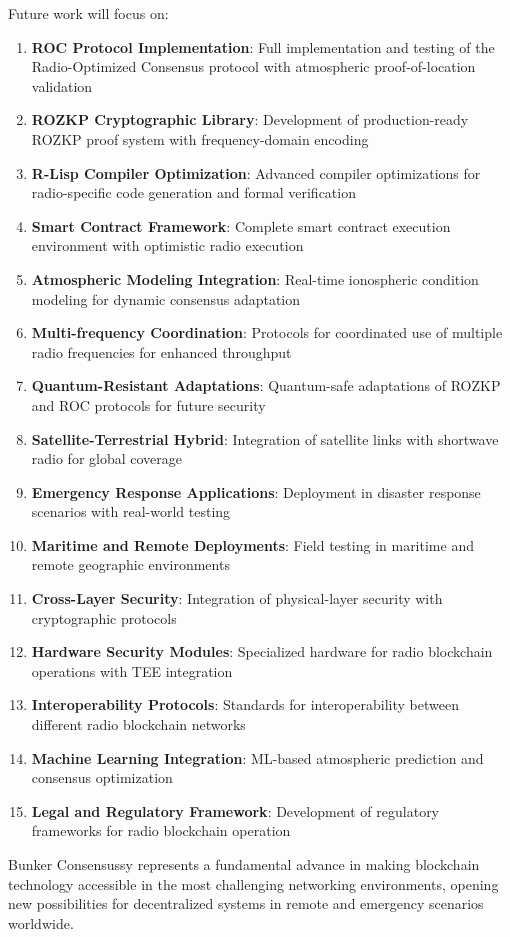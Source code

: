 \documentclass[11pt,a4paper]{article}
\begin{document}
Future work will focus on:
\begin{enumerate}
\item \textbf{ROC Protocol Implementation}: Full implementation and testing of the Radio-Optimized Consensus protocol with atmospheric proof-of-location validation
\item \textbf{ROZKP Cryptographic Library}: Development of production-ready ROZKP proof system with frequency-domain encoding
\item \textbf{R-Lisp Compiler Optimization}: Advanced compiler optimizations for radio-specific code generation and formal verification
\item \textbf{Smart Contract Framework}: Complete smart contract execution environment with optimistic radio execution
\item \textbf{Atmospheric Modeling Integration}: Real-time ionospheric condition modeling for dynamic consensus adaptation
\item \textbf{Multi-frequency Coordination}: Protocols for coordinated use of multiple radio frequencies for enhanced throughput
\item \textbf{Quantum-Resistant Adaptations}: Quantum-safe adaptations of ROZKP and ROC protocols for future security
\item \textbf{Satellite-Terrestrial Hybrid}: Integration of satellite links with shortwave radio for global coverage
\item \textbf{Emergency Response Applications}: Deployment in disaster response scenarios with real-world testing
\item \textbf{Maritime and Remote Deployments}: Field testing in maritime and remote geographic environments
\item \textbf{Cross-Layer Security}: Integration of physical-layer security with cryptographic protocols
\item \textbf{Hardware Security Modules}: Specialized hardware for radio blockchain operations with TEE integration
\item \textbf{Interoperability Protocols}: Standards for interoperability between different radio blockchain networks
\item \textbf{Machine Learning Integration}: ML-based atmospheric prediction and consensus optimization
\item \textbf{Legal and Regulatory Framework}: Development of regulatory frameworks for radio blockchain operation
\end{enumerate}

Bunker Consensussy represents a fundamental advance in making blockchain technology accessible in the most challenging networking environments, opening new possibilities for decentralized systems in remote and emergency scenarios worldwide.
\end{document}
